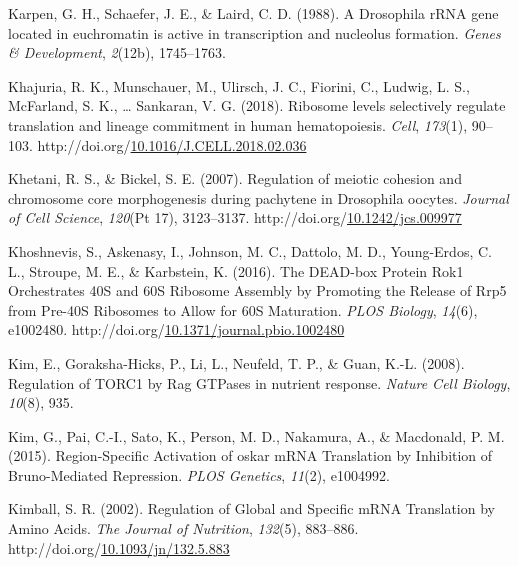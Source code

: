 \documentclass[12pt,oneside]{reedthesis}
\newlength{\cslhangindent}
\newenvironment{CSLReferences}[2] %
 {%
  \setlength{\parindent}{0pt}
  \ifodd #1 \everypar{\setlength{\hangindent}{\cslhangindent}}\ignorespaces\fi
  \ifnum #2 > 0
  \setlength{\parskip}{#2\baselineskip}
  \fi
 }%
 {}
\begin{document}
\begin{CSLReferences}{1}{0}
\leavevmode{}%
Karpen, G. H., Schaefer, J. E., \& Laird, C. D. (1988). A {Drosophila rRNA} gene located in euchromatin is active in transcription and nucleolus formation. \emph{Genes \& Development}, \emph{2}(12b), 1745--1763.

\leavevmode{}%
Khajuria, R. K., Munschauer, M., Ulirsch, J. C., Fiorini, C., Ludwig, L. S., McFarland, S. K., \ldots{} Sankaran, V. G. (2018). Ribosome levels selectively regulate translation and lineage commitment in human hematopoiesis. \emph{Cell}, \emph{173}(1), 90--103. http://doi.org/\href{https://doi.org/10.1016/J.CELL.2018.02.036}{10.1016/J.CELL.2018.02.036}

\leavevmode{}%
Khetani, R. S., \& Bickel, S. E. (2007). Regulation of meiotic cohesion and chromosome core morphogenesis during pachytene in {Drosophila} oocytes. \emph{Journal of Cell Science}, \emph{120}(Pt 17), 3123--3137. http://doi.org/\href{https://doi.org/10.1242/jcs.009977}{10.1242/jcs.009977}

\leavevmode{}%
Khoshnevis, S., Askenasy, I., Johnson, M. C., Dattolo, M. D., Young-Erdos, C. L., Stroupe, M. E., \& Karbstein, K. (2016). The {DEAD-box Protein Rok1 Orchestrates 40S} and {60S Ribosome Assembly} by {Promoting} the {Release} of {Rrp5} from {Pre-40S Ribosomes} to {Allow} for {60S Maturation}. \emph{PLOS Biology}, \emph{14}(6), e1002480. http://doi.org/\href{https://doi.org/10.1371/journal.pbio.1002480}{10.1371/journal.pbio.1002480}

\leavevmode{}%
Kim, E., Goraksha-Hicks, P., Li, L., Neufeld, T. P., \& Guan, K.-L. (2008). Regulation of {TORC1} by {Rag GTPases} in nutrient response. \emph{Nature Cell Biology}, \emph{10}(8), 935.

\leavevmode{}%
Kim, G., Pai, C.-I., Sato, K., Person, M. D., Nakamura, A., \& Macdonald, P. M. (2015). Region-{Specific Activation} of oskar {mRNA Translation} by {Inhibition} of {Bruno-Mediated Repression}. \emph{PLOS Genetics}, \emph{11}(2), e1004992.

\leavevmode{}%
Kimball, S. R. (2002). Regulation of {Global} and {Specific mRNA Translation} by {Amino Acids}. \emph{The Journal of Nutrition}, \emph{132}(5), 883--886. http://doi.org/\href{https://doi.org/10.1093/jn/132.5.883}{10.1093/jn/132.5.883}


\end{CSLReferences}
\end{document}
